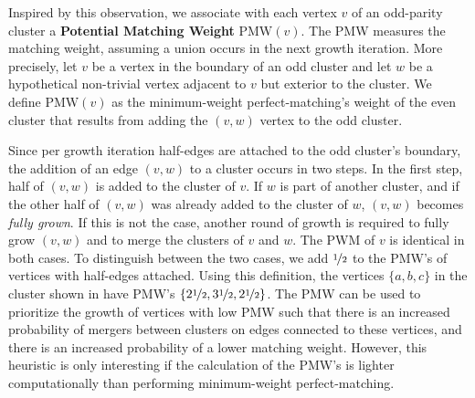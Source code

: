 Inspired by this observation, we associate with each vertex $v$ of an odd-parity cluster a \textbf{Potential Matching Weight} $\text{PMW}(v)$. The PMW measures the matching weight, assuming a union occurs in the next growth iteration. More precisely,
let $v$ be a vertex in the boundary of an odd cluster and let $w$ be a hypothetical non-trivial vertex adjacent to $v$ but exterior to the cluster. We define $\text{PMW}(v)$ as the minimum-weight perfect-matching's weight of the even cluster that results from adding the $(v,w)$ vertex to the odd cluster. %
    
Since per growth iteration half-edges are attached to the odd cluster's boundary, the addition of an edge $(v,w)$ to a cluster occurs in two steps. In the first step, half of $(v,w)$ is added to the cluster of $v$. If $w$ is part of another cluster, and if the other half of $(v,w)$ was already added to the cluster of $w$, $(v,w)$ becomes \emph{fully grown}. If this is not the case, another round of growth is required to fully grow $(v,w)$ and to merge the clusters of $v$ and $w$. The PWM of $v$ is identical in both cases. To distinguish between the two cases, we add $\nicefrac{1}{2}$ to the PMW's of vertices with half-edges attached. Using this definition, the vertices $\{a,b,c\}$ in the cluster shown in  have PMW's $\{2\nicefrac{1}{2}, 3\nicefrac{1}{2}, 2\nicefrac{1}{2}\}$. The PMW can be used to prioritize the growth of vertices with low PMW such that there is an increased probability of mergers between clusters on edges connected to these vertices, and there is an increased probability of a lower matching weight. However, this heuristic is only interesting if the calculation of the PMW's is lighter computationally than performing minimum-weight perfect-matching. %


